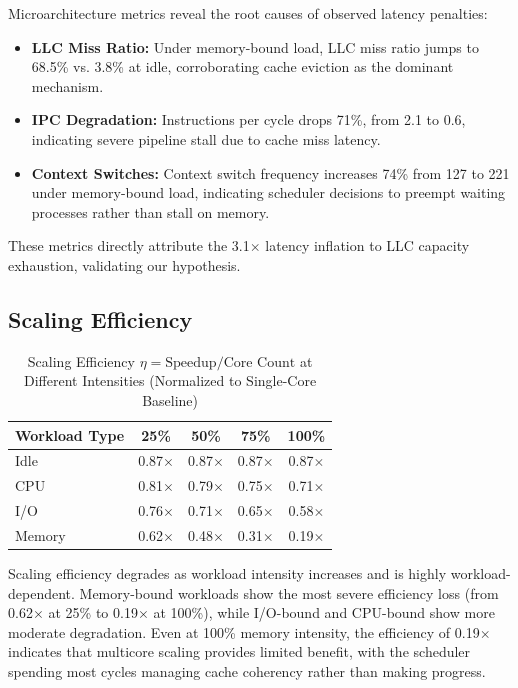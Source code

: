 \documentclass[conference]{IEEEtran}
\begin{document}
Microarchitecture metrics reveal the root causes of observed latency penalties:

\begin{itemize}
  \item \textbf{LLC Miss Ratio:} Under memory-bound load, LLC miss ratio jumps
        to 68.5\% vs. 3.8\% at idle, corroborating cache eviction as the
        dominant mechanism.
  \item \textbf{IPC Degradation:} Instructions per cycle drops 71\%, from 2.1
        to 0.6, indicating severe pipeline stall due to cache miss latency.
  \item \textbf{Context Switches:} Context switch frequency increases 74\% from
        127 to 221 under memory-bound load, indicating scheduler decisions to
        preempt waiting processes rather than stall on memory.
\end{itemize}

These metrics directly attribute the 3.1$\times$ latency inflation to LLC
capacity exhaustion, validating our hypothesis.

\subsection{Scaling Efficiency}

\begin{table}[h]
\centering
\caption{Scaling Efficiency $\eta = \text{Speedup} / \text{Core Count}$ at
         Different Intensities (Normalized to Single-Core Baseline)}
\label{tab:efficiency}
\begin{tabular}{lcccc}
\toprule
\textbf{Workload Type} & \textbf{25\%} & \textbf{50\%} & \textbf{75\%} &
\textbf{100\%} \\
\midrule
Idle         & 0.87$\times$ & 0.87$\times$ & 0.87$\times$ & 0.87$\times$ \\
CPU          & 0.81$\times$ & 0.79$\times$ & 0.75$\times$ & 0.71$\times$ \\
I/O          & 0.76$\times$ & 0.71$\times$ & 0.65$\times$ & 0.58$\times$ \\
Memory       & 0.62$\times$ & 0.48$\times$ & 0.31$\times$ & 0.19$\times$ \\
\bottomrule
\end{tabular}
\end{table}

Scaling efficiency degrades as workload intensity increases and is highly
workload-dependent. Memory-bound workloads show the most severe efficiency
loss (from 0.62$\times$ at 25\% to 0.19$\times$ at 100\%), while I/O-bound
and CPU-bound show more moderate degradation. Even at 100\% memory intensity,
the efficiency of 0.19$\times$ indicates that multicore scaling provides
limited benefit, with the scheduler spending most cycles managing cache
coherency rather than making progress.
\end{document}
